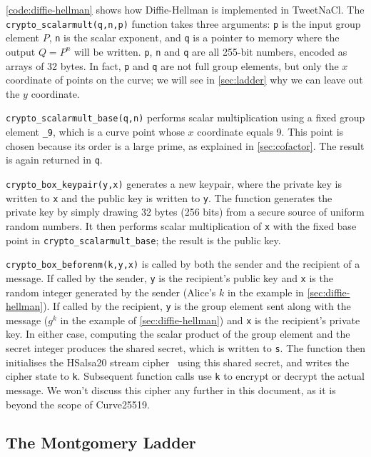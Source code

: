 \documentclass{article}
\begin{document}
\autoref{code:diffie-hellman} shows how Diffie-Hellman is implemented in TweetNaCl.
The \verb|crypto_scalarmult(q,n,p)| function takes three arguments: \verb|p| is the input group element $P$, \verb|n| is the scalar exponent, and \verb|q| is a pointer to memory where the output $Q=P^n$ will be written.
\verb|p|, \verb|n| and \verb|q| are all 255-bit numbers, encoded as arrays of 32 bytes.
In fact, \verb|p| and \verb|q| are not full group elements, but only the $x$ coordinate of points on the curve; we will see in \autoref{sec:ladder} why we can leave out the $y$ coordinate.

\verb|crypto_scalarmult_base(q,n)| performs scalar multiplication using a fixed group element \verb|_9|, which is a curve point whose $x$ coordinate equals 9.
This point is chosen because its order is a large prime, as explained in \autoref{sec:cofactor}.
The result is again returned in \verb|q|.

\verb|crypto_box_keypair(y,x)| generates a new keypair, where the private key is written to \verb|x| and the public key is written to \verb|y|.
The function generates the private key by simply drawing 32 bytes (256 bits) from a secure source of uniform random numbers.
It then performs scalar multiplication of \verb|x| with the fixed base point in \verb|crypto_scalarmult_base|; the result is the public key.

\verb|crypto_box_beforenm(k,y,x)| is called by both the sender and the recipient of a message.
If called by the sender, \verb|y| is the recipient's public key and \verb|x| is the random integer generated by the sender (Alice's $k$ in the example in \autoref{sec:diffie-hellman}).
If called by the recipient, \verb|y| is the group element sent along with the message ($g^k$ in the example of \autoref{sec:diffie-hellman}) and \verb|x| is the recipient's private key.
In either case, computing the scalar product of the group element and the secret integer produces the shared secret, which is written to \verb|s|.
The function then initialises the HSalsa20 stream cipher~\cite{Bernstein:2014ca} using this shared secret, and writes the cipher state to \verb|k|.
Subsequent function calls use \verb|k| to encrypt or decrypt the actual message.
We won't discuss this cipher any further in this document, as it is beyond the scope of Curve25519.

\subsection{The Montgomery Ladder}\label{sec:ladder}
\end{document}
